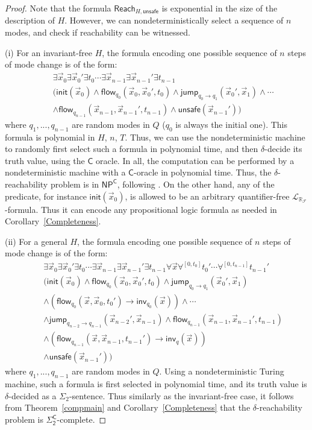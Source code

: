\documentclass[envcountsect]{llncs}
\newcommand{\flow}{\mathsf{flow}}
\newcommand{\jump}{\mathsf{jump}}
\newcommand{\inv}{\mathsf{inv}}
\newcommand{\init}{\mathsf{init}}
\newcommand{\reach}{\mathsf{Reach}}
\newcommand{\unsafe}{\mathsf{unsafe}}
\newcommand{\lrf}{\mathcal{L}_{\mathbb{R}_{\mathcal{F}}}}
\begin{document}
\begin{proof}
Note that the formula $\reach_{H,\unsafe}$ is exponential in the size of the description of $H$. However, we can nondeterministically select a sequence of $n$ modes, and check if reachability can be witnessed.

(i) For an invariant-free $H$, the formula encoding one possible sequence of $n$ steps of mode change is of the form:
\begin{eqnarray*}
& &\exists \vec x_0 \exists \vec x_0'\exists t_0\cdots \exists \vec x_{n-1}\exists\vec x_{n-1}'\exists t_{n-1}\\
& &\Big(\init(\vec x_0)\wedge \flow_{q_0}(\vec x_0, \vec x_0', t_0)\wedge \jump_{q_0\rightarrow q_1}(\vec x_0', \vec x_1)\wedge \cdots\\
& &\wedge \flow_{q_{n-1}}(\vec x_{n-1}, \vec x_{n-1}', t_{n-1}) \wedge \unsafe(\vec x_{n-1}')\Big)
\end{eqnarray*}
where $q_1,...,q_{n-1}$ are random modes in $Q$ ($q_0$ is always the initial one). This formula is polynomial in $H$, $n$, $T$. Thus, we can use the nondeterministic machine to randomly first select such a formula in polynomial time, and then $\delta$-decide its truth value, using the $\mathsf{C}$ oracle. In all, the computation can be performed by a nondeterministic machine with a $\mathsf{C}$-oracle in polynomial time. Thus, the $\delta$-reachability problem is in $\mathsf{NP^C}$, following . On the other hand, any of the predicate, for instance $\init(\vec x_0)$, is allowed to be an arbitrary quantifier-free $\lrf$-formula. Thus it can encode any propositional logic formula as needed in Corollary~\ref{Completeness}.

(ii) For a general $H$, the formula encoding one possible sequence of $n$ steps of mode change is of the form:
\begin{eqnarray*}
& &\exists \vec x_0 \exists \vec x_0'\exists t_0\cdots \exists \vec x_{n-1}\exists\vec x_{n-1}'\exists t_{n-1} \forall \vec x \forall^{[0,t_0]}t_0'\cdots \forall^{[0,t_{n-1}]}t_{n-1}'\\
& &\Big(\init(\vec x_0)\wedge \flow_{q_0}(\vec x_0, \vec x_0', t_0)\wedge \jump_{q_0\rightarrow q_1}(\vec x_0', \vec x_1)\\
& &\wedge (\flow_{q_0}(\vec x, \vec x_0, t_0')\rightarrow \inv_{q_0}(\vec x))\wedge \cdots\\
& &\wedge\jump_{q_{n-2}\rightarrow q_{n-1}}(\vec x_{n-2}', \vec x_{n-1}) \wedge \flow_{q_{n-1}}(\vec x_{n-1}, \vec x_{n-1}', t_{n-1})\\
& &\wedge (\flow_{q_{n-1}}(\vec x, \vec x_{n-1}, t_{n-1}')\rightarrow \inv_q(\vec x))\\
& &\wedge \unsafe(\vec x_{n-1}')\Big)
\end{eqnarray*}
where $q_1,...,q_{n-1}$ are random modes in $Q$. Using a nondeterministic Turing machine, such a formula is first selected in polynomial time, and its truth value is $\delta$-decided as a $\Sigma_2$-sentence. Thus similarly as the invariant-free case, it follows from Theorem~\ref{compmain} and Corollary~\ref{Completeness} that the $\delta$-reachability problem is $\mathsf{\Sigma_2^C}$-complete.
\end{proof}
\end{document}
